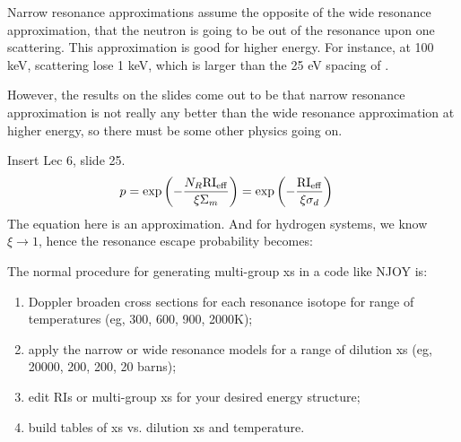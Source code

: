 \documentclass{school-22.211-notes}
\begin{document}
Narrow resonance approximations assume the opposite of the wide resonance approximation, that the neutron is going to be out of the resonance upon one scattering. This approximation is good for higher energy. For instance, at 100 keV, scattering lose 1 keV, which is larger than the 25 eV spacing of . 

However, the results on the slides come out to be that narrow resonance approximation is not really any better than the wide resonance approximation at higher energy, so there must be some other physics going on. 


Insert Lec 6, slide 25. 
\begin{align}
p &= \exp \left( - \frac{N_R \mathrm{RI}_{\mathrm{eff}}}{\xi \Sigma_m} \right)  = \exp \left( - \frac{\mathrm{RI}_{\mathrm{eff}}}{\xi \sigma_d} \right)
\end{align}
The equation here is an approximation. And for hydrogen systems, we know $\xi \to 1$, hence the resonance escape probability becomes:


The normal procedure for generating multi-group xs in a code like NJOY is:
\begin{enumerate}
\item Doppler broaden cross sections for each resonance isotope for range of temperatures (eg, 300, 600, 900, 2000K); 
\item apply the narrow or wide resonance models for a range of dilution xs (eg, 20000, 200, 200, 20 barns); 
\item edit RIs or multi-group xs for your desired energy structure; 
\item build tables of xs vs. dilution xs and temperature. 
\end{enumerate}
\end{document}
